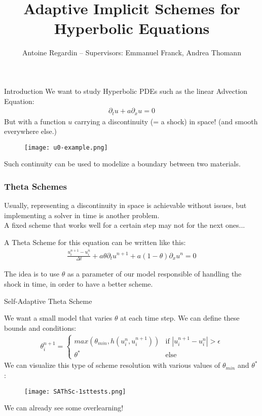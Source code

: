 \documentclass[10pt]{beamer}
\title[Adaptive Implicit Schemes for Hyperbolic Equations]{Adaptive Implicit Schemes for Hyperbolic Equations}
\author[]{Antoine Regardin -- Supervisors: Emmanuel Franck, Andrea Thomann}
\begin{document}
\frame{\titlepage}

\begin{frame}{Introduction}
    We want to study Hyperbolic PDEs such as the linear Advection Equation:
    \begin{align*}
        \partial_t u + a\partial_x u = 0
    \end{align*}
    But with a function $u$ carrying a discontinuity (= a shock) in space! (and smooth everywhere else.)
    \begin{figure}
        \centering
        \texttt{[image: u0-example.png]}
    \end{figure}
    Such continuity can be used to modelize a boundary between two materials.
\end{frame}

\begin{frame}
\frametitle{Theta Schemes}
Usually, representing a discontinuity in space is achievable without issues, but implementing a solver in time is another problem. %
\\ A fixed scheme that works well for a certain step may not for the next ones...
\vspace{12pt}

A Theta Scheme for this equation can be written like this:
\begin{align*}
    \frac{u_i^{n+1} - u_i^n}{\Delta t} + a\theta\partial_t u^{n+1} + a(1-\theta)\partial_x u^n = 0
\end{align*}

The idea is to use $\theta$ as a parameter of our model responsible of handling the shock in time, in order to have a better scheme.

\end{frame}

\begin{frame}{Self-Adaptive Theta Scheme}

    We want a small model that varies $\theta$ at each time step. We can define these bounds and conditions:
    \begin{align*}
        \theta_i^{n+1} = \begin{cases}
            max(\theta_{min}, h(u_i^n, u_i^{n+1})) & \text{if } |u_i^{n+1} - u_i^n| > \epsilon \\
            \theta^* & \text{else} 
        \end{cases}
    \end{align*}
    We can visualize this type of scheme resolution with various values of $\theta_{min}$ and $\theta^*$:
    \begin{figure}
        \centering
        \texttt{[image: SAThSc-1sttests.png]}
    \end{figure}
    We can already see some overlearning!

\end{frame}
\end{document}

